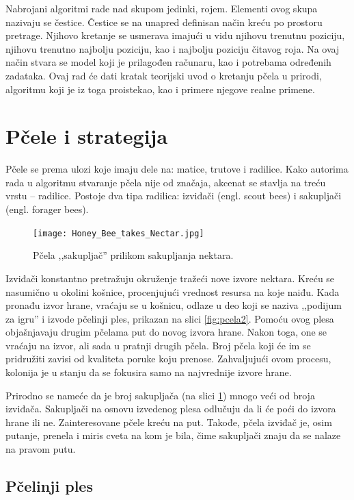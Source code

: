 \documentclass[a4paper]{article}
\begin{document}
{Nabrojani algoritmi rade nad skupom jedinki, rojem. Elementi ovog skupa nazivaju se čestice. Čestice se na unapred definisan način kreću po prostoru pretrage. Njihovo kretanje se usmerava imajući u vidu njihovu trenutnu poziciju, njihovu trenutno najbolju poziciju, kao i najbolju poziciju čitavog roja. Na ovaj način stvara se model koji je prilagođen računaru, kao i potrebama određenih zadataka. 
Ovaj rad će dati kratak teorijski uvod o kretanju pčela u prirodi, algoritmu koji je iz toga proistekao, kao i primere njegove realne primene.


\section{Pčele i strategija}
\label{subsec: ponasanje}
Pčele se prema ulozi koje imaju dele na: matice, trutove i radilice. Kako autorima rada u algoritmu stvaranje pčela nije od značaja, akcenat se stavlja na treću vrstu – radilice. Postoje dva tipa radilica: izviđači (engl. scout bees) i sakupljači (engl. forager bees). 

\begin{figure}[h!]
\begin{center}
\texttt{[image: Honey\_Bee\_takes\_Nectar.jpg]}
\end{center}
\caption{Pčela ,,sakupljač'' prilikom sakupljanja nektara.}

\label{fig:pcela1}
\end{figure}

Izviđači konstantno pretražuju okruženje tražeći nove izvore nektara. Kreću se nasumično u okolini košnice, procenjujući vrednost resursa na koje naiđu. Kada pronađu izvor hrane, vraćaju se u košnicu, odlaze u deo koji se naziva ,,podijum za igru'' i izvode pčelinji ples, prikazan na slici \ref{fig:pcela2}. Pomoću ovog plesa objašnjavaju drugim pčelama put do novog izvora hrane. Nakon toga, one se vraćaju na izvor, ali sada u pratnji drugih pčela. Broj pčela koji će im se pridružiti zavisi od kvaliteta poruke koju prenose. Zahvaljujući ovom procesu, kolonija je u stanju da se fokusira samo na najvrednije izvore hrane.

Prirodno se nameće da je broj sakupljača (na slici \ref{fig:pcela1}) mnogo veći od broja izviđača. Sakupljači na osnovu izvedenog plesa odlučuju da li će poći do izvora hrane ili ne. Zainteresovane pčele kreću na put. Takođe, pčela izviđač je, osim putanje, prenela i miris cveta na kom je bila, čime sakupljači znaju da se nalaze na pravom putu.

\subsection{Pčelinji ples}
\label{subsec:pcelinji ples}

}
\end{document}
